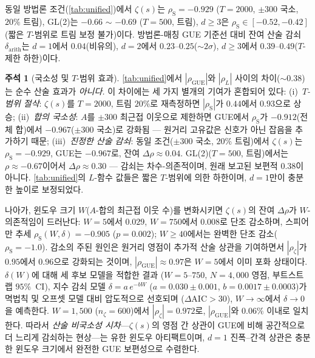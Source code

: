 \documentclass[11pt,a4paper]{article}
\theoremstyle{plain}
\theoremstyle{definition}
\newtheorem{remark}[theorem]{주석}
\DeclareMathOperator{\GUE}{GUE}
\begin{document}
동일 방법론 조건(\cref{tab:unified})에서
$\zeta(s)$는 $\rho_{\mathrm{S}} = -0.929$
($T = 2000$, $\pm 300$ 국소, $20\%$ 트림),
GL(2)는 $-0.66$ $\sim$ $-0.69$ ($T = 500$, 트림),
$d \ge 3$은 $\rho_{\mathrm{S}} \in [-0.52, -0.42]$
(짧은 $T$-범위로 트림 보정 불가)이다.
방법론-매칭 GUE 기준선 대비 잔여 산술 감쇠 $\delta_{\mathrm{arith}}$는
$d = 1$에서 $0.04$(비유의),
$d = 2$에서 $0.23$--$0.25$(${\sim}2\sigma$),
$d \ge 3$에서 $0.39$--$0.49$($T$-제한 하한)이다.

\begin{remark}[국소성 및 $T$-범위 효과]\label{rem:locality}
\cref{tab:unified}에서 $|\rho_{\GUE}|$와 $|\rho_L|$ 사이의 차이($\sim\!0.38$)는
순수 산술 효과가 \emph{아니다.} 이 차이에는 세 가지 별개의 기여가 혼합되어 있다:
(i)~\emph{$T$-범위 절삭}: $\zeta(s)$를 $T = 2000$, 트림 $20\%$로 재측정하면
$|\rho_{\mathrm{S}}|$가 $0.44$에서 $0.93$으로 상승;
(ii)~\emph{합의 국소성}: $A$를 $\pm 300$ 최근접 이웃으로 제한하면
GUE에서 $\rho_{\mathrm{S}}$가 $-0.912$(전체 합)에서 $-0.967$($\pm 300$ 국소)로 강화됨 ---
원거리 고유값은 신호가 아닌 잡음을 추가하기 때문;
(iii)~\emph{진정한 산술 감쇠}: 동일 조건($\pm 300$ 국소, $20\%$ 트림)에서
$\zeta(s)$는 $\rho_{\mathrm{S}} = -0.929$, GUE는 $-0.967$로,
잔여 $\Delta\rho \approx 0.04$.
GL(2)($T = 500$, 트림)에서는 $\rho \approx -0.67$이어서
$\Delta\rho \approx 0.30$ --- 감쇠는 차수-의존적이며,
원래 보고된 보편적 $0.38$이 아니다.
\cref{tab:unified}의 $L$-함수 값들은 짧은 $T$-범위에 의한 하한이며,
$d = 1$만이 충분한 높이로 보정되었다.

나아가, 윈도우 크기 $W$($A$-합의 최근접 이웃 수)를 변화시키면
$\zeta(s)$의 잔여 $\Delta\rho$가 $W$-의존적임이 드러난다:
$W\!=\!5$에서 $0.029$, $W\!=\!750$에서 $0.008$로 단조 감소하며,
스피어만 추세 $\rho_{\mathrm{S}}(W,\delta) = -0.905$ ($p = 0.002$);
$W \ge 40$에서는 완벽한 단조 감소($\rho_{\mathrm{S}} = -1.0$).
감소의 주된 원인은 원거리 영점이 추가적 산술 상관을 기여하면서
$|\rho_\zeta|$가 $0.95$에서 $0.96$으로 강화되는 것이며,
$|\rho_{\GUE}| \approx 0.97$은 $W\!=\!5$에서 이미 포화 상태이다.
$\delta(W)$에 대해 세 후보 모델을 적합한 결과
($W = 5$--$750$, $N = 4{,}000$ 영점, 부트스트랩 $95\%$~CI),
지수 감쇠 모델 $\delta = a \, e^{-bW}$
($a = 0.030 \pm 0.001$, $b = 0.0017 \pm 0.0003$)가
멱법칙 및 오프셋 모델 대비 압도적으로 선호되며
($\Delta\mathrm{AIC} > 30$), $W \to \infty$에서 $\delta \to 0$을
예측한다. $W = 1{,}500$ ($n_\zeta = 600$)에서
$|\rho_\zeta| = 0.972$로, $|\rho_{\GUE}|$와 $0.06\%$ 이내로 일치한다.
따라서 \emph{산술 비국소성 시차}---$\zeta(s)$의 영점 간 상관이
GUE에 비해 공간적으로 더 느리게 감쇠하는 현상---는
유한 윈도우 아티팩트이며,
$d\!=\!1$ 진폭--간격 상관은 충분한 윈도우 크기에서
완전한 GUE 보편성으로 수렴한다.
\end{remark}
\end{document}
